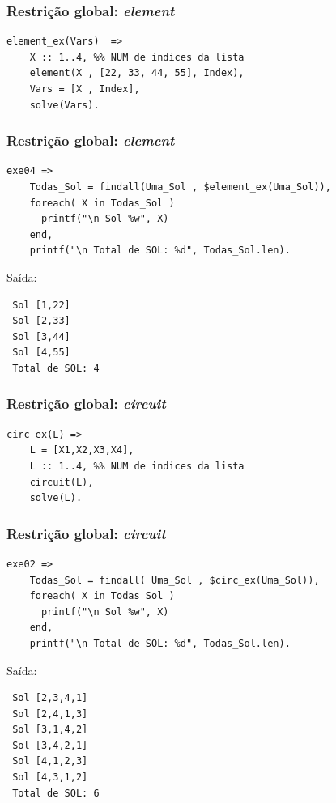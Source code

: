 \begin{frame}[fragile]
 \frametitle{Restrição global: \textit{element}}

\begin{verbatim}
element_ex(Vars)  =>  
    X :: 1..4, %% NUM de indices da lista
    element(X , [22, 33, 44, 55], Index),
    Vars = [X , Index],
    solve(Vars).
\end{verbatim}

\end{frame}
\begin{frame}[fragile]
 \frametitle{Restrição global: \textit{element}}

\begin{footnotesize}
\begin{verbatim}
exe04 => 
    Todas_Sol = findall(Uma_Sol , $element_ex(Uma_Sol)),
    foreach( X in Todas_Sol )
      printf("\n Sol %w", X)
    end,
    printf("\n Total de SOL: %d", Todas_Sol.len).  
\end{verbatim}
\end{footnotesize}
\pause

Saída:
\begin{footnotesize}
\begin{verbatim}
 Sol [1,22]
 Sol [2,33]
 Sol [3,44]
 Sol [4,55]
 Total de SOL: 4
\end{verbatim}
\end{footnotesize}
\end{frame}

\begin{frame}[fragile]
 \frametitle{Restrição global: \textit{circuit}}

\begin{verbatim}
circ_ex(L) =>
    L = [X1,X2,X3,X4], 
    L :: 1..4, %% NUM de indices da lista
    circuit(L),
    solve(L).
\end{verbatim}

\end{frame}
\begin{frame}[fragile]
 \frametitle{Restrição global: \textit{circuit}}

\begin{footnotesize}
\begin{verbatim}
exe02 => 
    Todas_Sol = findall( Uma_Sol , $circ_ex(Uma_Sol)),
    foreach( X in Todas_Sol )
      printf("\n Sol %w", X)
    end,
    printf("\n Total de SOL: %d", Todas_Sol.len).  
\end{verbatim}
\end{footnotesize}
\pause

Saída:
\begin{footnotesize}
\begin{verbatim}
 Sol [2,3,4,1]
 Sol [2,4,1,3]
 Sol [3,1,4,2]
 Sol [3,4,2,1]
 Sol [4,1,2,3]
 Sol [4,3,1,2]
 Total de SOL: 6
\end{verbatim}
\end{footnotesize}
\end{frame}


